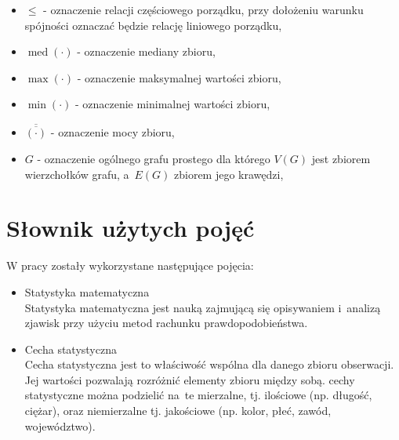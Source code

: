 \documentclass[12pt,a4paper]{report}
\newcommand{\mediana}{\operatorname{med}}
\newcommand{\licznosc}[1]{\overline{\overline{#1}}}
\begin{document}
\begin{itemize}
\item $\leq$ - oznaczenie relacji częściowego porządku, przy dołożeniu warunku spójności oznaczać będzie relację liniowego porządku,
\item $\mediana{(\cdot)}$ - oznaczenie mediany zbioru,
\item $\max{(\cdot)}$ - oznaczenie maksymalnej wartości zbioru,
\item $\min{(\cdot)}$ - oznaczenie minimalnej wartości zbioru,
\item $\licznosc{(\cdot)}$ - oznaczenie mocy zbioru,
\item $G$ - oznaczenie ogólnego grafu prostego dla którego $V(G)$ jest zbiorem wierzchołków grafu, a~$E(G)$ zbiorem jego krawędzi,




\end{itemize}


\section{Słownik użytych pojęć}
W pracy zostały wykorzystane następujące pojęcia:
\begin{itemize}
\item Statystyka matematyczna \cite[w oparciu o~rozdział 1]{krysicki1999}\\
Statystyka matematyczna jest nauką zajmującą się opisywaniem i~analizą zjawisk przy użyciu metod rachunku prawdopodobieństwa. 


 
 
\item Cecha statystyczna \cite[Rozdział 1]{krysicki1999}\\
Cecha statystyczna jest to właściwość wspólna dla danego zbioru obserwacji. Jej wartości pozwalają rozróżnić elementy zbioru między sobą. cechy statystyczne można podzielić na~te mierzalne, tj. ilościowe (np. długość, ciężar), oraz niemierzalne tj. jakościowe (np. kolor, płeć, zawód, województwo).

\end{itemize}
\end{document}
